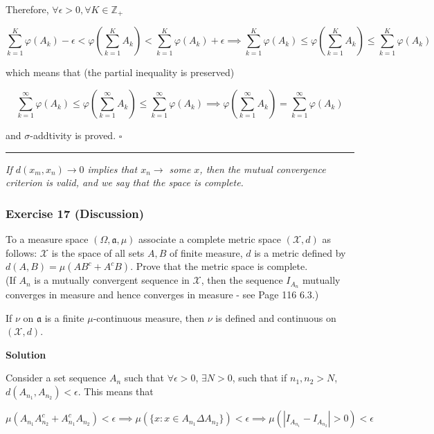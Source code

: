 \documentclass[
]{article}
\begin{document}
Therefore, \(\forall \epsilon > 0, \forall K \in \mathbb Z_+\)

\[\sum_{k=1}^K\varphi\left( A_k\right) - \epsilon < \varphi\left(\sum_{k=1}^K A_k\right) < \sum_{k=1}^K\varphi\left( A_k\right) + \epsilon \implies \sum_{k=1}^K\varphi\left( A_k\right) \le \varphi\left(\sum_{k=1}^K A_k\right) \le \sum_{k=1}^K\varphi\left( A_k\right)\]

which means that (the partial inequality is preserved)

\[\sum_{k=1}^\infty \varphi\left( A_k\right) \le  \varphi\left(\sum_{k=1}^\infty A_k\right)  \le \sum_{k=1}^\infty\varphi\left( A_k\right) \implies \varphi\left(\sum_{k=1}^\infty A_k\right) = \sum_{k=1}^\infty \varphi\left( A_k\right)\]

and \(\sigma\)-addtivity is proved. \(\square\)

\begin{center}\rule{0.5\linewidth}{0.5pt}\end{center}

\emph{If \(d\left(x_m, x_n\right) \rightarrow 0\) implies that
  \(x_n \rightarrow\) some \(x\), then the mutual convergence criterion is
  valid, and we say that the space is complete.}

\hypertarget{exercise-17-discussion}{%
  \subsubsection{Exercise 17 (Discussion)}\label{exercise-17-discussion}}

To a measure space \((\Omega, \mathfrak a, \mu)\) associate a complete
metric space \((\mathcal{X}, d)\) as follows: \(\mathcal X\) is the
space of all sets \(A, B\) of finite measure, \(d\) is a metric defined
by \(d(A, B)=\mu\left(A B^c+A^c B\right)\). Prove that the metric space
is complete.\\
(If \(A_n\) is a mutually convergent sequence in \(\mathcal X\), then
the sequence \(I_{A_n}\) mutually converges in measure and hence
converges in measure - see Page 116 6.3.)

If \(\nu\) on \(\mathfrak a\) is a finite \(\mu\)-continuous measure,
then \(\nu\) is defined and continuous on \((\mathcal{X}, d)\).

\textbf{Solution}

Consider a set sequence \(A_n\) such that \(\forall \epsilon > 0\),
\(\exists N > 0\), such that if \(n_1,n_2 > N\),
\(d(A_{n_1}, A_{n_2}) < \epsilon\). This means that

\[\mu\left(A_{n_1}A_{n_2}^c+A_{n_1}^cA_{n_2}\right) < \epsilon \implies \mu\left(\{x: x\in A_{n_1}\Delta A_{n_2}\}\right) < \epsilon \implies \mu\left(\left|I_{A_{n_1}} - I_{A_{n_2}}\right| > 0 \right) < \epsilon\]
\end{document}
